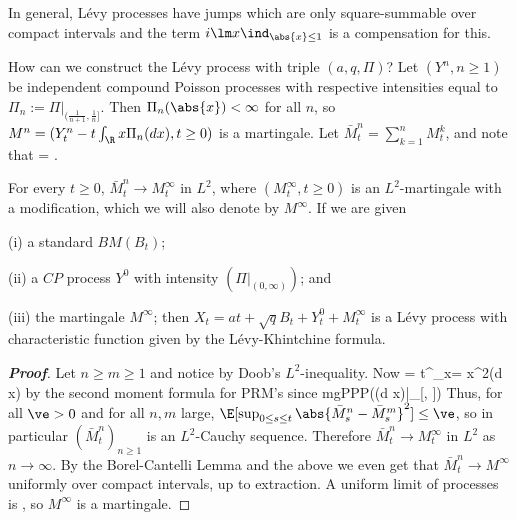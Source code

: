 In general, L\'evy processes have jumps which are only square-summable over compact intervals and the term $i\lm x \ind_{\abs{x} \leq1}$ is a compensation for this.

How can we construct the L\'evy process with triple $(a, q,\Pi)$? Let $(Y^n, n \geq 1)$ be independent compound Poisson processes with respective intensities equal to $\Pi_n := \Pi|_{(\frac 1{n+1}, \frac 1n]}$. Then $\Pi_n(\abs{x}) < \infty$ for all $n$, so $M^n = (Y^n_t - t\int_\R x\Pi_n(d x), t \geq 0)$ is a martingale. Let $\bar{M}^n_t = \sum^n_{k=1} M^k_t$, and note that
\be
\E[e^{i\lm M^n_t} ] = \exp{}.
\ee

\begin{theorem}
For every $t \geq 0$, $\bar{M}^n_t \to M^\infty_t$ in $L^2$, where $(M^\infty_t , t \geq 0)$ is an $L^2$-martingale with a \cadlag modification, which we will also denote by $M^\infty$. If we are given
\ben
\item [(i)] a standard $BM (B_t)$;
\item [(ii)] a $CP$ process $Y^0$ with intensity $(\Pi|_{(0,\infty)})$; and
\item [(iii)] the martingale $M^\infty$;
\een
then $X_t = at + \sqrt{q}B_t + Y^0_t + M^\infty_t$ is a \cadlag L\'evy process with characteristic function given by the L\'evy-Khintchine formula.
\end{theorem}

\begin{proof}[\bf Proof]
Let $n \geq m \geq 1$ and notice
\be
\E{} 
\ee
by Doob's $L^2$-inequality. Now
\be
\E{} = t\int^{}_{x= } x^2\Pi(d x)
\ee
by the second moment formula for PRM's since
\be
mg\lra PPP(\Pi(d x)|_{[, ])}
\ee
Thus, for all $\ve > 0$ and for all $n,m$ large, $\E[\sup_{0\leq s\leq t} \abs{\bar{M}^n_s - \bar{M}^m_s}^2] \leq \ve$, so in particular $(\bar{M}^n_t)_{n\geq 1}$ is an $L^2$-Cauchy sequence. Therefore $\bar{M}^n_t \to  M^\infty_t$ in $L^2$ as $n\to \infty$. By the Borel-Cantelli Lemma and the above we even get that $\bar{M}^n_t \to M^\infty$ uniformly over compact intervals, up to extraction. A uniform limit of \cadlag processes is \cadlag, so $M^\infty$ is a \cadlag martingale.
\end{proof}



